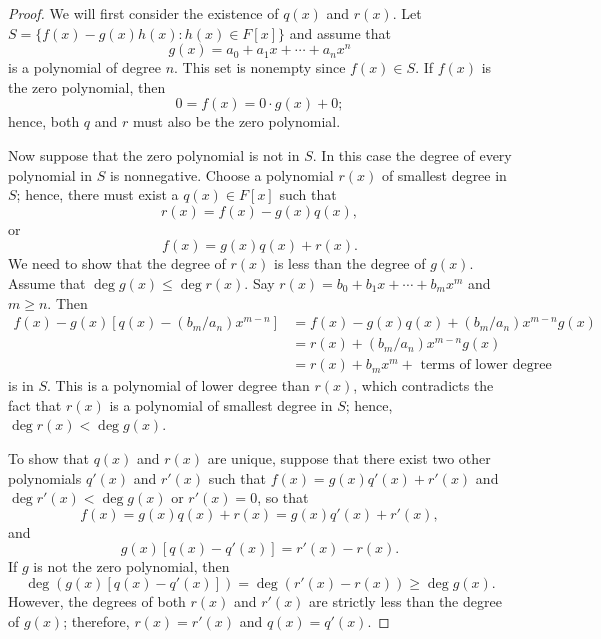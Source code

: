  
\begin{proof}
We will first consider the existence of $q(x)$ and $r(x)$. Let $S = \{
f(x) - g(x) h(x)   :  h(x) \in F[x]  \}$ and assume that 
\[
g(x) = a_0 + a_1 x + \cdots + a_n x^n
\]
is a polynomial of degree $n$. This set is nonempty since $f(x) \in
S$. If $f(x)$ is the zero polynomial, then 
\[
0 = f(x) = 0 \cdot g(x) + 0;
\]
hence, both $q$ and $r$ must also be the zero polynomial. 
 
 
Now suppose that the zero polynomial is not in $S$. In this case the
degree of every polynomial in $S$ is nonnegative.  Choose a polynomial
$r(x)$ of smallest degree in $S$; hence, there must exist a $q(x) \in
F[x]$ such that  
\[
r(x) = f(x) - g(x) q(x),
\]
or 
\[
f(x) = g(x ) q(x) + r(x).
\]
We need to show that the degree of $r(x)$ is less than the degree of
$g(x)$. Assume that $\deg g(x) \leq \deg r(x)$. Say $r(x) = b_0 + b_1 
x + \cdots + b_m x^m$ and $m \geq n$. Then
\begin{align*}
f(x) - g(x) [ q(x) - (b_m/a_n) x^{m-n} ]
& = f(x) - g(x) q(x) 
    +  (b_m/a_n) x^{m-n} g(x)  \\
& = r(x) + (b_m/a_n) x^{m-n} g(x) \\
& = r(x) + b_m x^m    + \mbox{ terms of lower degree}
\end{align*}
is in $S$. This is a polynomial of lower degree than $r(x)$, which
contradicts the fact that $r(x)$ is a polynomial of smallest degree
in $S$; hence, $\deg r(x) < \deg g(x)$.
 
 
To show that  $q(x)$ and $r(x)$ are unique, suppose that there exist
two other polynomials $q'(x)$ and $r'(x)$ such that $f(x) = g(x) q'(x)
+ r'(x)$ and $\deg r'(x) < \deg g(x)$ or $r'(x) = 0$, so that
\[
f(x) = g(x) q(x) + r(x) = g(x) q'(x) + r'(x),
\]
and
\[
g(x) [q(x) - q'(x) ] = r'(x) - r(x).
\]
If $g$ is not the zero polynomial, then 
\[
\deg( g(x) [q(x) - q'(x) ] )= \deg( r'(x) - r(x) ) \geq \deg g(x).
\]
However, the degrees of both $r(x)$ and $r'(x)$ are strictly less than
the degree of $g(x)$; therefore, $r(x) = r'(x)$ and $q(x) = q'(x)$.
\end{proof}
 
